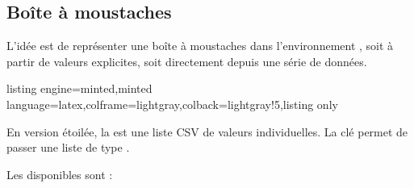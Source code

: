 \documentclass[11pt,a4paper]{ltxdoc}
\begin{document}


\pagebreak

\subsection{Boîte à moustaches}\label{boitemoustaches}

L'idée est de représenter une boîte à moustaches dans l'environnement , soit à partir de valeurs explicites, soit directement depuis une série de données.

\begin{tcblisting}{listing engine=minted,minted language=latex,colframe=lightgray,colback=lightgray!5,listing only}
\end{tcblisting}

En version étoilée, la  est une liste \textsf{CSV} de valeurs individuelles. La clé  permet de passer une liste de type .

\smallskip

Les \MontreCode{[clés]} disponibles sont :
\end{document}
